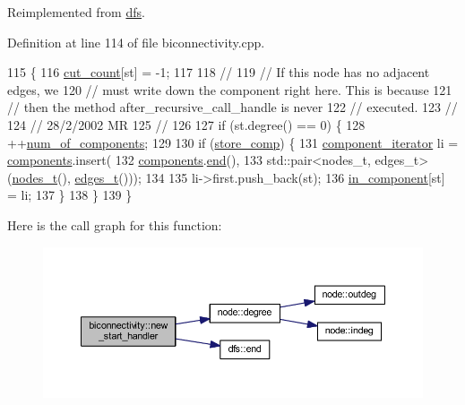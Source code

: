 Reimplemented from \mbox{\hyperlink{classdfs_a304b14458fb78f9feb3d8d5683d3cab5}{dfs}}.



Definition at line 114 of file biconnectivity.\+cpp.


\begin{DoxyCode}
115 \{
116     \mbox{\hyperlink{classbiconnectivity_a67756de28954d13df615d8f2a93b22da}{cut\_count}}[st] = -1;
117 
118     \textcolor{comment}{//}
119     \textcolor{comment}{// If this node has no adjacent edges, we}
120     \textcolor{comment}{// must write down the component right here. This is because}
121     \textcolor{comment}{// then the method after\_recursive\_call\_handle is never}
122     \textcolor{comment}{// executed.}
123     \textcolor{comment}{//}
124     \textcolor{comment}{// 28/2/2002 MR}
125     \textcolor{comment}{// }
126 
127     \textcolor{keywordflow}{if} (st.degree() == 0) \{
128         ++\mbox{\hyperlink{classbiconnectivity_a89fbd540b8a61aad150020be657ddfb7}{num\_of\_components}};
129 
130         \textcolor{keywordflow}{if} (\mbox{\hyperlink{classbiconnectivity_a989307b07f4a976649bd7551173bd564}{store\_comp}}) \{
131             \mbox{\hyperlink{classbiconnectivity_aef69aa0c23bfcd945e385350154b6483}{component\_iterator}} li = \mbox{\hyperlink{classcomponents}{components}}.insert(
132                 \mbox{\hyperlink{classcomponents}{components}}.\mbox{\hyperlink{classdfs_af847633fa642258d3522e8deb26aef37}{end}}(),
133                 std::pair<nodes\_t, edges\_t>(\mbox{\hyperlink{edge_8h_a22ac17689106ba21a84e7bc54d1199d6}{nodes\_t}}(), \mbox{\hyperlink{edge_8h_a8f9587479bda6cf612c103494b3858e3}{edges\_t}}()));
134 
135             li->first.push\_back(st);
136             \mbox{\hyperlink{classbiconnectivity_a487da69817fa89ab3d1523ad9846ae8e}{in\_component}}[st] = li;
137         \}
138     \}
139 \}
\end{DoxyCode}
Here is the call graph for this function\+:\nopagebreak
\begin{figure}[H]
\begin{center}
\leavevmode
\includegraphics[width=350pt]{classbiconnectivity_ae94213830755f1f4d477ec6bff0f25b8_cgraph}
\end{center}
\end{figure}
\mbox{\label{classdfs_a4efe5bb72d00305e6b226e67c2b2ef6e}} 
